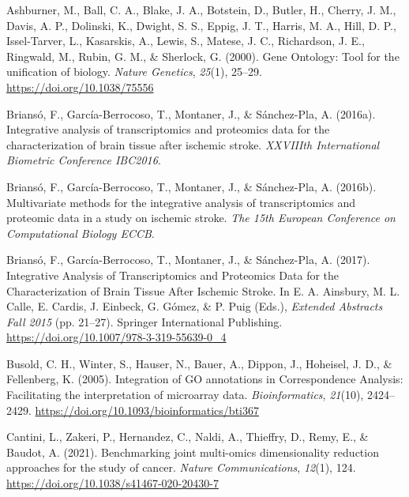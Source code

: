 \documentclass[a4paper, nobind]{templates/ociamthesis}
\newlength{\cslhangindent}
\newenvironment{CSLReferences}[2] %
 {%
  \setlength{\parindent}{0pt}
  \ifodd #1
  \let\oldpar\par
  \def\par{\hangindent=\cslhangindent\oldpar}
  \fi
  \setlength{\parskip}{1mm}
  \setlength{\baselineskip}{6mm}
 }%
 {}
\begin{document}

\hypertarget{refs}{}
\begin{CSLReferences}{1}{0}
\leavevmode{}%
Ashburner, M., Ball, C. A., Blake, J. A., Botstein, D., Butler, H., Cherry, J. M., Davis, A. P., Dolinski, K., Dwight, S. S., Eppig, J. T., Harris, M. A., Hill, D. P., Issel-Tarver, L., Kasarskis, A., Lewis, S., Matese, J. C., Richardson, J. E., Ringwald, M., Rubin, G. M., \& Sherlock, G. (2000). Gene {Ontology}: Tool for the unification of biology. \emph{Nature Genetics}, \emph{25}(1), 25--29. \url{https://doi.org/10.1038/75556}

\leavevmode{}%
Briansó, F., García-Berrocoso, T., Montaner, J., \& Sánchez-Pla, A. (2016a). Integrative analysis of transcriptomics and proteomics data for the characterization of brain tissue after ischemic stroke. \emph{XXVIIIth International Biometric Conference IBC2016}.

\leavevmode{}%
Briansó, F., García-Berrocoso, T., Montaner, J., \& Sánchez-Pla, A. (2016b). Multivariate methods for the integrative analysis of transcriptomics and proteomic data in a study on ischemic stroke. \emph{The 15th European Conference on Computational Biology ECCB}.

\leavevmode{}%
Briansó, F., García-Berrocoso, T., Montaner, J., \& Sánchez-Pla, A. (2017). Integrative {Analysis} of {Transcriptomics} and {Proteomics} {Data} for the {Characterization} of {Brain} {Tissue} {After} {Ischemic} {Stroke}. In E. A. Ainsbury, M. L. Calle, E. Cardis, J. Einbeck, G. Gómez, \& P. Puig (Eds.), \emph{Extended {Abstracts} {Fall} 2015} (pp. 21--27). Springer International Publishing. \url{https://doi.org/10.1007/978-3-319-55639-0_4}

\leavevmode{}%
Busold, C. H., Winter, S., Hauser, N., Bauer, A., Dippon, J., Hoheisel, J. D., \& Fellenberg, K. (2005). Integration of {GO} annotations in {Correspondence} {Analysis}: Facilitating the interpretation of microarray data. \emph{Bioinformatics}, \emph{21}(10), 2424--2429. \url{https://doi.org/10.1093/bioinformatics/bti367}

\leavevmode{}%
Cantini, L., Zakeri, P., Hernandez, C., Naldi, A., Thieffry, D., Remy, E., \& Baudot, A. (2021). Benchmarking joint multi-omics dimensionality reduction approaches for the study of cancer. \emph{Nature Communications}, \emph{12}(1), 124. \url{https://doi.org/10.1038/s41467-020-20430-7}


\end{CSLReferences}
\end{document}
